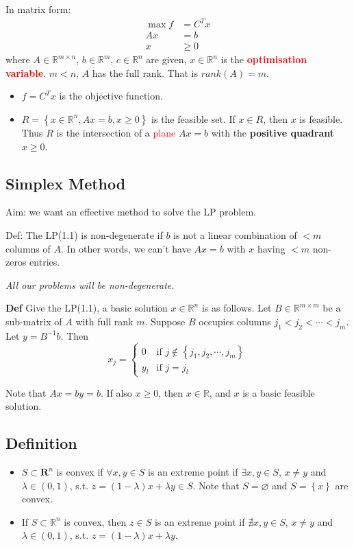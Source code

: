 In matrix form: 
\begin{align}
    \max {} f &= C^T x \nonumber \\
    Ax &= b\nonumber \\
    x & \ge 0 \label{LP matrix}
\end{align}
where $A\in\mathbb{R}^{m\times n}$, $b\in\mathbb{R}^m$, $c\in\mathbb{R}^n$ are given, $x\in\mathbb{R}^n$ is the \textcolor{red}{\textbf{optimisation variable}}. $m<n$, $A$ has the full rank. That is $rank(A) = m$.

\begin{itemize}
    \item $f = C^T x$ is the objective function.
    \item $R = \left\lbrace x\in\mathbb{R}^n, Ax = b, x\ge 0 \right\rbrace$ is the feasible set. If $x\in R$, then $x$ is feasible. Thus $R$ is the intersection of a \textcolor{red}{plane} $Ax = b$ with the \textbf{positive quadrant} $x\ge 0$.
\end{itemize}

\subsection{Simplex Method}

Aim: we want an effective method to solve the LP problem.

Def: The LP(1.1) is non-degenerate if $b$ is not a linear combination of $<m$ columns of $A$. In other words, we can't have $Ax = b$ with $x$ having $<m$ non-zeros entries.

\textit{All our problems will be non-degenerate.}

\bigskip \noindent \textbf{Def} Give the LP(1.1), a basic solution $x\in\mathbb{R}^n$ is as follows. Let $B\in\mathbb{R}^{m\times m}$ be a sub-matrix of $A$ with full rank $m$. Suppose $B$ occupies columns $j_1<j_2<\cdots<j_m$. Let $y = B^{-1}b$. Then 
$$
    x_j = \left\lbrace 
    \begin{array}{ll}
        0 & \text{if } j\notin \left\lbrace j_1, j_2, \cdots, j_m \right\rbrace \\
        y_l & \text{if } j = j_l 
    \end{array}
    \right.
$$

Note that $Ax = by =b$. If also $x\ge 0$, then $x\in\mathbb{R}$, and $x$ is a basic feasible solution.\\

\subsection{Definition}
\begin{itemize}
    \item $S\subset \mathbf{R}^n$ is convex if $\forall x, y\in S$ is an extreme point if $\exists x,y\in S$, $x\neq y$ and $\lambda\in(0, 1)$, s.t. $z = (1-\lambda)x + \lambda y\in S$. Note that $S = \varnothing$ and $S = \left\lbrace x\right\rbrace$ are convex.
    \item If $S\subset \mathbb{R}^n$ is convex, then $z\in S$ is an extreme point if $ \nexists x,y\in S$, $x\neq y$ and $\lambda\in(0,1)$, s.t. $z = (1 -\lambda)x + \lambda y$.
\end{itemize}


